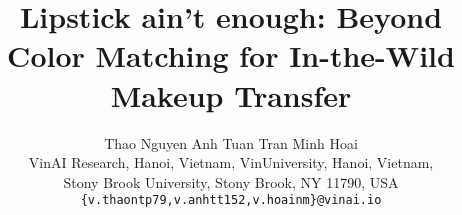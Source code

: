 \documentclass[final]{cvpr}
\begin{document}
\ifshowsolution  
\newcommand{\Comment}[1]{\paragraph{\bf  COMMENT:} {\sf #1} \bigskip}
\newcommand{\Solution}[2]{\paragraph{\bf  SOLUTION:} {\sf #2} }
\newcommand{\Mistake}[2]{\paragraph{\bf  COMMON MISTAKE #1:} {\sf #2} \bigskip}
\else
\newcommand{\Solution}[2]{\vspace{#1}}
\fi

\newcommand{\truefalse}{
\begin{enumerate}
	\item True
	\item False
\end{enumerate}
}

\newcommand{\yesno}{
\begin{enumerate}
	\item Yes
	\item No
\end{enumerate}
}

 
\title{Lipstick ain't enough: Beyond Color Matching for In-the-Wild Makeup Transfer}




\author{
Thao Nguyen \quad Anh Tuan Tran \quad Minh Hoai \\
VinAI Research, Hanoi, Vietnam,
VinUniversity, Hanoi, Vietnam,\\
Stony Brook University, Stony Brook, NY 11790, USA\\
{\tt\small \{v.thaontp79,v.anhtt152,v.hoainm\}@vinai.io}
}

\makeatletter
\let\@oldmaketitle\@maketitle

\renewcommand{\@maketitle}{\@oldmaketitle
\vspace{-8mm}
\centering
\texttt{[image: imgs/teaser\_3.pdf]}
\vskip -0.1in
\captionof{figure}{In-the-wild facial makeup consists of both color transfer and pattern addition. We propose a holistic method that can transfer the color and pattern from a reference makeup style to another image.} \label{fig:feature-graphic}

\vspace{3mm}
}
\makeatletter
\end{document}

